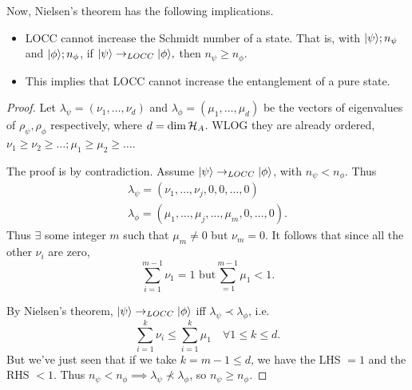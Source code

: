 Now, Nielsen's theorem has the following implications.
\begin{itemize}
    \item LOCC cannot increase the Schmidt number of a state. That is, with $\lvert\psi\rangle; n_\psi$ and $\lvert\phi\rangle;n_\phi$, if $\lvert\psi\rangle\to_{LOCC} \lvert\phi\rangle,$ then $n_\psi \geq n_\phi$.
    \item This implies that LOCC cannot increase the entanglement of a pure state.
\end{itemize}
\begin{proof}
    Let $\lambda_\psi = (\nu_1,\ldots, \nu_d)$ and $\lambda_\phi=(\mu_1,\ldots,\mu_d)$ be the vectors of eigenvalues of $\rho_\psi,\rho_\phi$ respectively, where $d=\dim \mathcal H_A$. WLOG they are already ordered, $\nu_1 \geq \nu_2 \geq \ldots; \mu_1 \geq \mu_2 \geq \ldots$.
    
    The proof is by contradiction. Assume $\lvert\psi\rangle\to_{LOCC}\lvert\phi\rangle$, with $n_\psi < n_\phi$. Thus
    \begin{gather*}
        \lambda_\psi = (\nu_1, \ldots, \nu_j, 0,0,\ldots,0)\\
        \lambda_\phi =(\mu_1,\ldots,\mu_j,\ldots,\mu_m,0,\ldots,0).
    \end{gather*}
    Thus $\exists$ some integer $m$ such that $\mu_m\neq 0$ but $\nu_m=0$. It follows that since all the other $\nu_i$ are zero,
    \begin{equation}
        \sum_{i=1}^{m-1}\nu_1 =1\text{ but} \sum_{=1}^{m-1} \mu_1 < 1.
    \end{equation}
    
    By Nielsen's theorem, $\lvert\psi\rangle \to_{LOCC} \lvert\phi\rangle$ iff $\lambda_\psi \prec \lambda_\phi$, i.e.
    \begin{equation}
        \sum_{i=1}^k \nu_i \leq \sum_{i=1}^k \mu_1 \quad \forall 1\leq k \leq d.
    \end{equation}
    But we've just seen that if we take $k=m-1 \leq d$, we have the LHS $=1$ and the RHS $<1$. Thus $n_\psi < n_\phi \implies \lambda_\psi \not\prec \lambda_\phi$, so $n_\psi \geq n_\phi$.
\end{proof}

